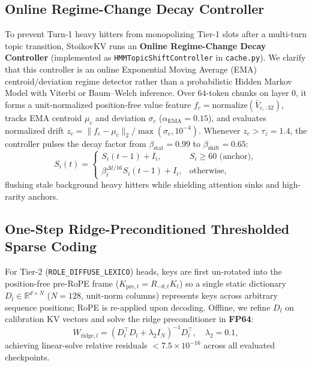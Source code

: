 \documentclass[conference]{IEEEtran}
\begin{document}
\subsection{Online Regime-Change Decay Controller}
To prevent Turn-1 heavy hitters from monopolizing Tier-1 slots after a multi-turn topic transition, StoikovKV runs an \textbf{Online Regime-Change Decay Controller} (implemented as \texttt{HMMTopicShiftController} in \texttt{cache.py}). We clarify that this controller is an online Exponential Moving Average (EMA) centroid/deviation regime detector rather than a probabilistic Hidden Markov Model with Viterbi or Baum--Welch inference. Over $64$-token chunks on layer $0$, it forms a unit-normalized position-free value feature $f_c = \text{normalize}(\bar{V}_{c, :32})$, tracks EMA centroid $\mu_c$ and deviation $\sigma_c$ ($\alpha_{\text{EMA}} = 0.15$), and evaluates normalized drift $z_c = \|f_c - \mu_c\|_2 / \max(\sigma_c, 10^{-4})$. Whenever $z_c > \tau_z = 1.4$, the controller pulses the decay factor from $\beta_{\text{stat}} = 0.99$ to $\beta_{\text{shift}} = 0.65$:
\begin{equation}
S_i(t) = \begin{cases}
S_i(t-1) + I_i, & S_i \ge 60\text{ (anchor)}, \\
\beta_t^{\Delta t / 16} S_i(t-1) + I_i, & \text{otherwise},
\end{cases}
\label{eq:regime_decay}
\end{equation}
flushing stale background heavy hitters while shielding attention sinks and high-rarity anchors.

\subsection{One-Step Ridge-Preconditioned Thresholded Sparse Coding}
For Tier-2 (\texttt{ROLE\_DIFFUSE\_LEXICO}) heads, keys are first un-rotated into the position-free pre-RoPE frame ($K_{\text{pre},t} = R_{-\theta,t} K_t$) so a single static dictionary $D_l \in \mathbb{R}^{d \times N}$ ($N = 128$, unit-norm columns) represents keys across arbitrary sequence positions; RoPE is re-applied upon decoding. Offline, we refine $D_l$ on calibration KV vectors and solve the ridge preconditioner in \textbf{FP64}:
\begin{equation}
W_{\text{ridge}, l} = \left(D_l^\top D_l + \lambda_2 I_N\right)^{-1} D_l^\top, \quad \lambda_2 = 0.1,
\label{eq:w_ridge}
\end{equation}
achieving linear-solve relative residuals $< 7.5 \times 10^{-16}$ across all evaluated checkpoints.
\end{document}
